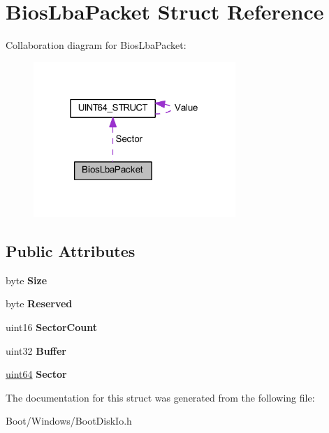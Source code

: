 \hypertarget{struct_bios_lba_packet}{}\section{Bios\+Lba\+Packet Struct Reference}
\label{struct_bios_lba_packet}


Collaboration diagram for Bios\+Lba\+Packet\+:
\nopagebreak
\begin{figure}[H]
\begin{center}
\leavevmode
\includegraphics[width=217pt]{struct_bios_lba_packet__coll__graph}
\end{center}
\end{figure}
\subsection*{Public Attributes}
\begin{DoxyCompactItemize}
\item 
\mbox{\label{struct_bios_lba_packet_add1a030e918e00256d6a993e71fa2760}} 
byte {\bfseries Size}
\item 
\mbox{\label{struct_bios_lba_packet_abee133b9463762af0ae0d5381fab047a}} 
byte {\bfseries Reserved}
\item 
\mbox{\label{struct_bios_lba_packet_ac34cf9013058a39c09e6a2e1112e2a87}} 
uint16 {\bfseries Sector\+Count}
\item 
\mbox{\label{struct_bios_lba_packet_ab6c220e716f335b5ec4b431992ae3e3b}} 
uint32 {\bfseries Buffer}
\item 
\mbox{\label{struct_bios_lba_packet_a3b7658a4e82daa6cbf1dfbc7e3c508d9}} 
\hyperlink{union_u_i_n_t64___s_t_r_u_c_t}{uint64} {\bfseries Sector}
\end{DoxyCompactItemize}


The documentation for this struct was generated from the following file\+:\begin{DoxyCompactItemize}
\item 
Boot/\+Windows/Boot\+Disk\+Io.\+h\end{DoxyCompactItemize}
